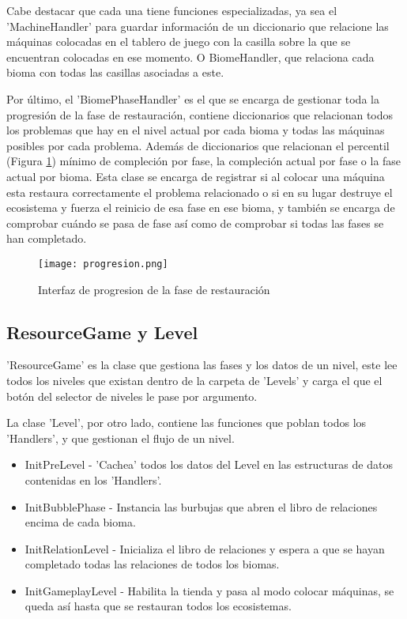 Cabe destacar que cada una tiene funciones especializadas, ya sea el 'MachineHandler' para guardar información de un diccionario que relacione las máquinas colocadas en el tablero de juego con la casilla sobre la que se encuentran colocadas en ese momento. O BiomeHandler, que relaciona cada bioma con todas las casillas asociadas a este.

Por último, el 'BiomePhaseHandler' es el que se encarga de gestionar toda la progresión de la fase de restauración, contiene diccionarios que relacionan todos los problemas que hay en el nivel actual por cada bioma y todas las máquinas posibles por cada problema. Además de diccionarios que relacionan el percentil (Figura \ref{fig:progresion}) mínimo de compleción por fase, la compleción actual por fase o la fase actual por bioma. Esta clase se encarga de registrar si al colocar una máquina esta restaura correctamente el problema relacionado o si en su lugar destruye el ecosistema y fuerza el reinicio de esa fase en ese bioma, y también se encarga de comprobar cuándo se pasa de fase así como de comprobar si todas las fases se han completado.

\begin{figure}[H]
    \centering
      \texttt{[image: progresion.png]}
    \caption{Interfaz de progresion de la fase de restauración}
    \label{fig:progresion}
  \end{figure}

\subsection{ResourceGame y Level}

'ResourceGame' es la clase que gestiona las fases y los datos de un nivel, este lee todos los niveles que existan dentro de la carpeta de 'Levels' y carga el que el botón del selector de niveles le pase por argumento.

La clase 'Level', por otro lado, contiene las funciones que poblan todos los 'Handlers', y que gestionan el flujo de un nivel.
\begin{itemize}
    \item InitPreLevel - 'Cachea' todos los datos del Level en las estructuras de datos contenidas en los 'Handlers'.
    \item InitBubblePhase - Instancia las burbujas que abren el libro de relaciones encima de cada bioma.
    \item InitRelationLevel - Inicializa el libro de relaciones y espera a que se hayan completado todas las relaciones de todos los biomas.
    \item InitGameplayLevel - Habilita la tienda y pasa al modo colocar máquinas, se queda así hasta que se restauran todos los ecosistemas.
\end{itemize}

